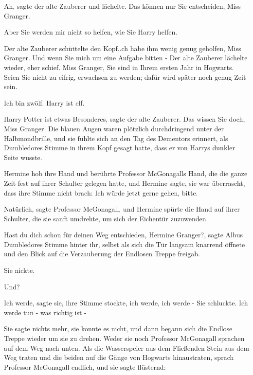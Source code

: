 \glqq{}Ah\grqq{}, sagte der alte Zauberer und lächelte. \glqq{}Das können nur Sie
entscheiden, Miss Granger.\grqq{}

\glqq{}Aber Sie werden mir nicht so helfen, wie Sie Harry helfen.\grqq{}

Der alte Zauberer schüttelte den Kopf.\grqq{}.ch habe ihm wenig genug geholfen,
Miss Granger. Und wenn Sie mich um eine Aufgabe bitten -\grqq{} Der alte Zauberer
lächelte wieder, eher schief. \glqq{}Miss Granger, Sie sind in Ihrem ersten Jahr
in Hogwarts. Seien Sie nicht zu eifrig, erwachsen zu werden; dafür wird später
noch genug Zeit sein.\grqq{}

\glqq{}Ich bin zwölf. Harry ist elf.\grqq{}

\glqq{}Harry Potter ist etwas Besonderes\grqq{}, sagte der alte Zauberer. \glqq{}
Das wissen Sie doch, Miss Granger.\grqq{} Die blauen Augen waren plötzlich
durchdringend unter der Halbmondbrille, und sie fühlte sich an den Tag des
Dementors erinnert, als Dumbledores Stimme in ihrem Kopf gesagt hatte, dass er
von Harrys dunkler Seite wusste.

Hermine hob ihre Hand und berührte Professor McGonagalls Hand, die die ganze
Zeit fest auf ihrer Schulter gelegen hatte, und Hermine sagte, sie war
überrascht, dass ihre Stimme nicht brach: \glqq{}Ich würde jetzt gerne gehen,
bitte.\grqq{}

\glqq{}Natürlich\grqq{}, sagte Professor McGonagall, und Hermine spürte die Hand
auf ihrer Schulter, die sie sanft umdrehte, um sich der Eichentür zuzuwenden.

\glqq{}Hast du dich schon für deinen Weg entschieden, Hermine Granger?\grqq{},
sagte Albus Dumbledores Stimme hinter ihr, selbst als sich die Tür langsam
knarrend öffnete und den Blick auf die Verzauberung der Endlosen Treppe freigab.

Sie nickte.

\glqq{}Und?\grqq{}

\glqq{}Ich werde\grqq{}, sagte sie, ihre Stimme stockte, \glqq{}ich werde, ich
werde -\grqq{} Sie schluckte. \glqq{}Ich werde tun - was richtig ist -\grqq{}

Sie sagte nichts mehr, sie konnte es nicht, und dann begann sich die Endlose
Treppe wieder um sie zu drehen. Weder sie noch Professor McGonagall sprachen auf
dem Weg nach unten. Als die Wasserspeier aus dem Fließenden Stein aus dem Weg
traten und die beiden auf die Gänge von Hogwarts hinaustraten, sprach Professor
McGonagall endlich, und sie sagte flüsternd:


